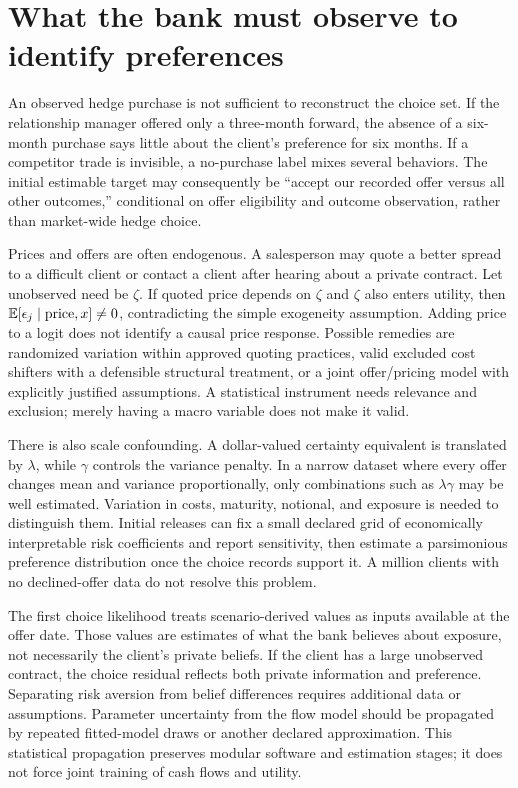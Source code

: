 \section{What the bank must observe to identify preferences}
An observed hedge purchase is not sufficient to reconstruct the choice set. If the relationship manager offered only a three-month forward, the absence of a six-month purchase says little about the client's preference for six months. If a competitor trade is invisible, a no-purchase label mixes several behaviors. The initial estimable target may consequently be ``accept our recorded offer versus all other outcomes,'' conditional on offer eligibility and outcome observation, rather than market-wide hedge choice.

Prices and offers are often endogenous. A salesperson may quote a better spread to a difficult client or contact a client after hearing about a private contract. Let unobserved need be $\zeta$. If quoted price depends on $\zeta$ and $\zeta$ also enters utility, then $\mathbb E[\epsilon_j\mid\text{price},x]\ne0$, contradicting the simple exogeneity assumption. Adding price to a logit does not identify a causal price response. Possible remedies are randomized variation within approved quoting practices, valid excluded cost shifters with a defensible structural treatment, or a joint offer/pricing model with explicitly justified assumptions. A statistical instrument needs relevance and exclusion; merely having a macro variable does not make it valid.

There is also scale confounding. A dollar-valued certainty equivalent is translated by $\lambda$, while $\gamma$ controls the variance penalty. In a narrow dataset where every offer changes mean and variance proportionally, only combinations such as $\lambda\gamma$ may be well estimated. Variation in costs, maturity, notional, and exposure is needed to distinguish them. Initial releases can fix a small declared grid of economically interpretable risk coefficients and report sensitivity, then estimate a parsimonious preference distribution once the choice records support it. A million clients with no declined-offer data do not resolve this problem.

The first choice likelihood treats scenario-derived values as inputs available at the offer date. Those values are estimates of what the bank believes about exposure, not necessarily the client's private beliefs. If the client has a large unobserved contract, the choice residual reflects both private information and preference. Separating risk aversion from belief differences requires additional data or assumptions. Parameter uncertainty from the flow model should be propagated by repeated fitted-model draws or another declared approximation. This statistical propagation preserves modular software and estimation stages; it does not force joint training of cash flows and utility.

